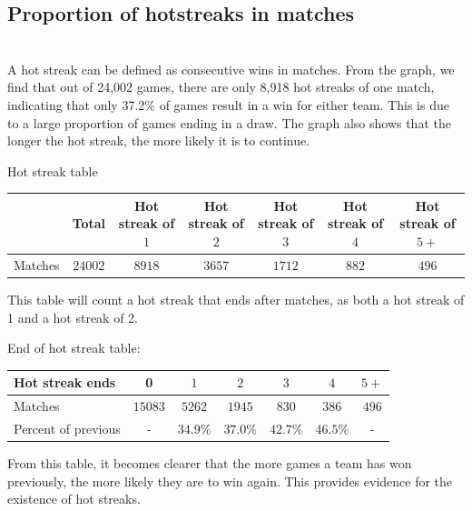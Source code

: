 \documentclass{article}
\begin{document}
\subsection{Proportion of hotstreaks in matches}
\\[19\baselineskip]
A hot streak can be defined as consecutive wins in matches. From the graph, we find that out of 24,002 games, there are only 8,918 hot streaks of one match, indicating that only 37.2$\%$ of games result in a win for either team. This is due to a large proportion of games ending in a draw. The graph also shows that the longer the hot streak, the more likely it is to continue.
\begin{center}
Hot streak table
\begin{tabular}{lcccccc}
\hline
    &Total&Hot streak of $1$&Hot streak of $2$&Hot streak of $3$&Hot streak of $4$&Hot streak of $5+$\\
\hline
    Matches&$24002$&$8918$&$3657$&$1712$&$882$&$496$\\  
\hline
\end{tabular}
\end{center}
\vspace{8mm}
This table will count a hot streak that ends after matches, as both a hot streak of 1 and a hot streak of 2.
\vspace{8mm}
\begin{center}
End of hot streak table:
\begin{tabular}{lcccccc}
\hline
    Hot streak ends&0&$1$&$2$&$3$&$4$&$5+$\\
\hline
    Matches&$15083$&$5262$&$1945$&$830$&$386$&$496$\\
    Percent of previous&-&$34.9\%$&$37.0\%$&$42.7\%$&$46.5\%$&-\\
\hline
\end{tabular}
\end{center}
From this table, it becomes clearer that the more games a team has won previously, the more likely they are to win again. This provides evidence for the existence of hot streaks.
\newpage
\end{document}
